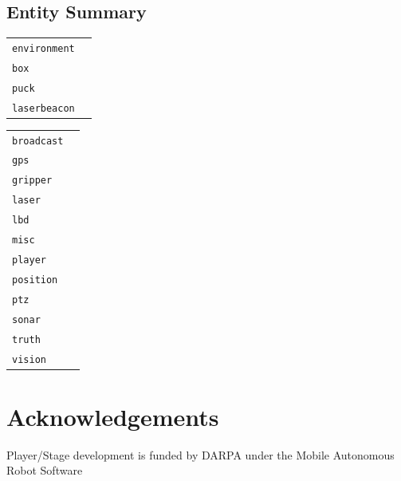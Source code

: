 \documentclass[11pt]{report}
\begin{document}
\section{Entity Summary}

\noindent
\begin{tabularx}{\columnwidth}{lX}
\hline 
\verb'environment' & \\
\verb'box' & \\
\verb'puck' & \\
\verb'laserbeacon' & \\
\hline
\end{tabularx}

\noindent
\begin{tabularx}{\columnwidth}{lX}
\hline
\verb'broadcast' & \\
\verb'gps' & \\ 
\verb'gripper' & \\
\verb'laser' & \\
\verb'lbd' & \\
\verb'misc' & \\
\verb'player' & \\
\verb'position' & \\
\verb'ptz' & \\
\verb'sonar' & \\
\verb'truth' & \\
\verb'vision' & \\
\hline
\end{tabularx}


\chapter*{Acknowledgements}
Player/Stage development is funded by DARPA under the Mobile Autonomous Robot Software
\end{document}
